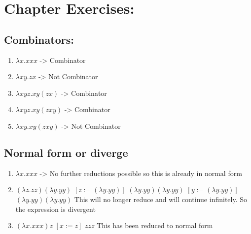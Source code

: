 \documentclass[11pt]{article}
\author{Abhigya Maskay}
\date{\today}
\title{}
\begin{document}
\section{Chapter Exercises:}
\label{sec:orgf34e3aa}
\subsection{Combinators:}
\label{sec:orgb794611}
\begin{enumerate}
\item \({\lambda}x.xxx\) -> Combinator
\item \({\lambda}xy.zx\) -> Not Combinator
\item \({\lambda}xyz.xy(zx)\) -> Combinator
\item \({\lambda}xyz.xy(zxy)\) -> Combinator
\item \({\lambda}xy.xy(zxy)\) -> Not Combinator
\end{enumerate}
\subsection{Normal form or diverge}
\label{sec:orgcb1484c}
\begin{enumerate}
\item \({\lambda}x.xxx\) -> No further reductions possible so this is already in normal form
\item \(({\lambda}z.zz) ({\lambda}y.yy)\)
\([z := ({\lambda}y.yy)]\)
\(({\lambda}y.yy)({\lambda}y.yy)\)
\([ y := ({\lambda}y.yy)]\)
\(({\lambda}y.yy)({\lambda}y.yy)\)
This will no longer reduce and will continue infinitely. So the expression is divergent
\item \(({\lambda}x.xxx)z\)
\([x := z]\)
\(zzz\)
This has been reduced to normal form
\end{enumerate}
\end{document}
